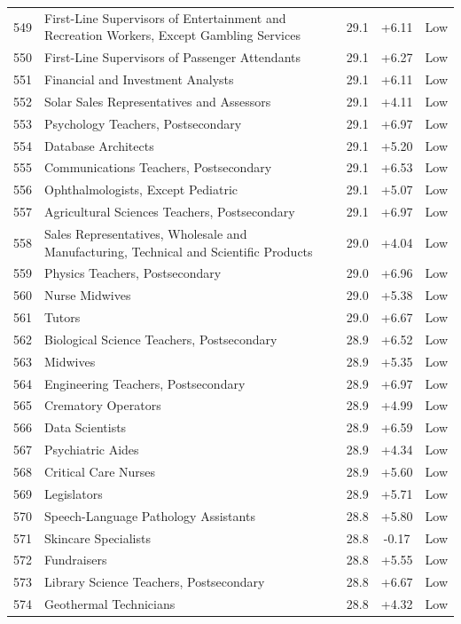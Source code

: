 {\begin{longtable}{rp{7cm}ccc}
549 & First-Line Supervisors of Entertainment and Recreation Workers, Except Gambling Services & 29.1 & +6.11 & Low \\
550 & First-Line Supervisors of Passenger Attendants & 29.1 & +6.27 & Low \\
551 & Financial and Investment Analysts & 29.1 & +6.11 & Low \\
552 & Solar Sales Representatives and Assessors & 29.1 & +4.11 & Low \\
553 & Psychology Teachers, Postsecondary & 29.1 & +6.97 & Low \\
554 & Database Architects & 29.1 & +5.20 & Low \\
555 & Communications Teachers, Postsecondary & 29.1 & +6.53 & Low \\
556 & Ophthalmologists, Except Pediatric & 29.1 & +5.07 & Low \\
557 & Agricultural Sciences Teachers, Postsecondary & 29.1 & +6.97 & Low \\
558 & Sales Representatives, Wholesale and Manufacturing, Technical and Scientific Products & 29.0 & +4.04 & Low \\
559 & Physics Teachers, Postsecondary & 29.0 & +6.96 & Low \\
560 & Nurse Midwives & 29.0 & +5.38 & Low \\
561 & Tutors & 29.0 & +6.67 & Low \\
562 & Biological Science Teachers, Postsecondary & 28.9 & +6.52 & Low \\
563 & Midwives & 28.9 & +5.35 & Low \\
564 & Engineering Teachers, Postsecondary & 28.9 & +6.97 & Low \\
565 & Crematory Operators & 28.9 & +4.99 & Low \\
566 & Data Scientists & 28.9 & +6.59 & Low \\
567 & Psychiatric Aides & 28.9 & +4.34 & Low \\
568 & Critical Care Nurses & 28.9 & +5.60 & Low \\
569 & Legislators & 28.9 & +5.71 & Low \\
570 & Speech-Language Pathology Assistants & 28.8 & +5.80 & Low \\
571 & Skincare Specialists & 28.8 & -0.17 & Low \\
572 & Fundraisers & 28.8 & +5.55 & Low \\
573 & Library Science Teachers, Postsecondary & 28.8 & +6.67 & Low \\
574 & Geothermal Technicians & 28.8 & +4.32 & Low \\

\end{longtable}}
